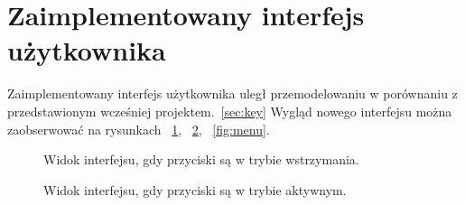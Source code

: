\documentclass[twoside,a4paper]{book}
\begin{document}
\section{Zaimplementowany interfejs użytkownika}
Zaimplementowany interfejs użytkownika uległ przemodelowaniu w porównaniu z przedstawionym wcześniej projektem.~\ref{sec:key} Wygląd nowego interfejsu można zaobserwować na rysunkach ~\ref{fig:view1}, ~\ref{fig:view2}, ~\ref{fig:menu}.
	\begin{figure}
		\centering
		\caption{Widok interfejsu, gdy przyciski są w trybie wstrzymania.}
		\label{fig:view1}
		\end{figure}
			\begin{figure}
		\centering
		\caption{Widok interfejsu, gdy przyciski są w trybie aktywnym.}
		\label{fig:view2}
		\end{figure}
\end{document}
